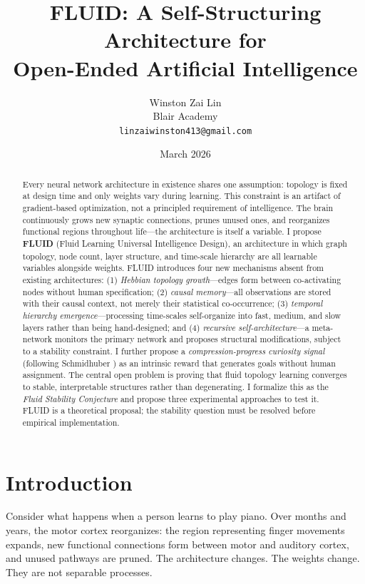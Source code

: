\documentclass[12pt]{article}
\title{\textbf{FLUID: A Self-Structuring Architecture for\\
Open-Ended Artificial Intelligence}}
\author{
    Winston Zai Lin \\
    \small Blair Academy \\
    \small \texttt{linzaiwinston413@gmail.com}
}
\date{March 2026}
\begin{document}
\maketitle

\begin{abstract}
Every neural network architecture in existence shares one assumption: topology is fixed at design time and only weights vary during learning. This constraint is an artifact of gradient-based optimization, not a principled requirement of intelligence. The brain continuously grows new synaptic connections, prunes unused ones, and reorganizes functional regions throughout life---the architecture is itself a variable. I propose \textbf{FLUID} (Fluid Learning Universal Intelligence Design), an architecture in which graph topology, node count, layer structure, and time-scale hierarchy are all learnable variables alongside weights. FLUID introduces four new mechanisms absent from existing architectures: (1) \textit{Hebbian topology growth}---edges form between co-activating nodes without human specification; (2) \textit{causal memory}---all observations are stored with their causal context, not merely their statistical co-occurrence; (3) \textit{temporal hierarchy emergence}---processing time-scales self-organize into fast, medium, and slow layers rather than being hand-designed; and (4) \textit{recursive self-architecture}---a meta-network monitors the primary network and proposes structural modifications, subject to a stability constraint. I further propose a \textit{compression-progress curiosity signal} (following Schmidhuber \cite{schmidhuber2010}) as an intrinsic reward that generates goals without human assignment. The central open problem is proving that fluid topology learning converges to stable, interpretable structures rather than degenerating. I formalize this as the \textit{Fluid Stability Conjecture} and propose three experimental approaches to test it. FLUID is a theoretical proposal; the stability question must be resolved before empirical implementation.
\end{abstract}

\section{Introduction}

Consider what happens when a person learns to play piano. Over months and years, the motor cortex reorganizes: the region representing finger movements expands, new functional connections form between motor and auditory cortex, and unused pathways are pruned. The architecture changes. The weights change. They are not separable processes.
\end{document}
